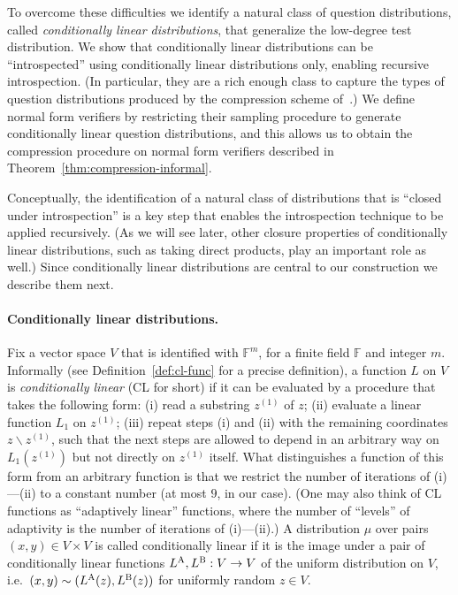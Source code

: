 \documentclass[11pt]{article}
\theoremstyle{definition}
\newcommand{\F}{\ensuremath{\mathbb{F}}}
\newcommand{\labelstyle}[1]{\ensuremath{\textsc{#1}}\xspace}
\newcommand{\alice}{\labelstyle{A}}
\newcommand{\bob}{\labelstyle{B}}
\begin{document}
	To overcome these difficulties we identify a natural class of question distributions, called \emph{conditionally linear distributions}, that generalize the low-degree test distribution. We show that conditionally linear distributions can be ``introspected'' using conditionally linear distributions only, enabling recursive introspection. (In particular, they are a rich enough class to capture the types of question distributions produced by the compression scheme of~\cite{NW19}.) We define normal form verifiers by restricting their sampling procedure to generate conditionally linear question distributions, and this allows us to obtain the compression procedure on normal form verifiers described in Theorem~\ref{thm:compression-informal}. 
	
	Conceptually,  the identification of a natural class of distributions that is ``closed under introspection'' is a key step that enables the introspection technique to be applied recursively. (As we will see later, other closure properties of conditionally linear distributions, such as taking direct products, play an important role as well.) Since conditionally linear distributions are central to our construction we describe them next. 
	


\paragraph{Conditionally linear distributions.} 
Fix a vector space $V$ that is identified with $\F^m$, for a finite field $\F$ and integer $m$. Informally (see Definition~\ref{def:cl-func} for a precise definition), a function $L$ on $V$ is \emph{conditionally linear} (CL for short) if it can be evaluated by a procedure that takes the following form: (i) read a substring $z^{(1)}$ of $z$; (ii) evaluate a linear function $L_1$ on $z^{(1)}$; (iii) repeat steps (i) and (ii) with the remaining coordinates $z\backslash z^{(1)}$, such that the next steps are allowed to depend in an arbitrary way on $L_1(z^{(1)})$ but not directly on $z^{(1)}$ itself. What distinguishes a function of this form from an arbitrary function is that we restrict the number of iterations of (i)---(ii) to a constant number (at most $9$, in our case). (One may also think of CL functions as ``adaptively linear'' functions, where the number of ``levels'' of adaptivity is the number of iterations of (i)---(ii).) A distribution $\mu$ over pairs $(x,y) \in V\times V$ is called {conditionally linear}  if it is the image under a pair of {conditionally linear functions} $L^\alice,L^\bob: V\to V$ of the uniform distribution on $V$, i.e.\ $(x,y)\sim (L^\alice(z),L^\bob(z))$ for uniformly random $z\in V$. 
\end{document}
